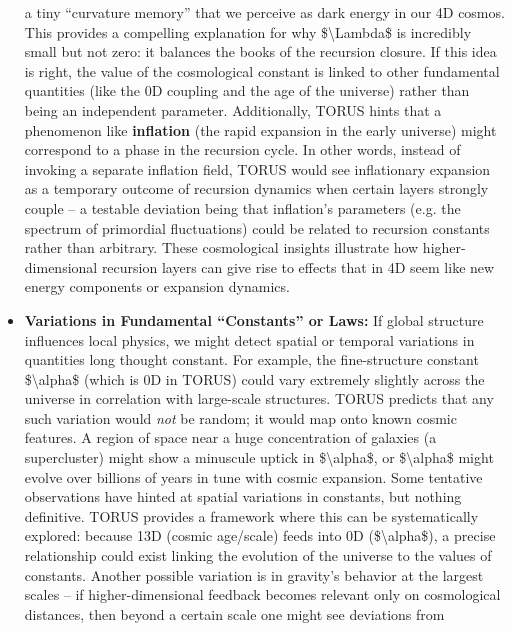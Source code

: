 \documentclass[
]{article}
\begin{document}
\begin{itemize}
  a tiny ``curvature memory'' that we perceive as dark energy in our 4D
  cosmos. This provides a compelling explanation for why
  \$\textbackslash Lambda\$ is incredibly small but not zero: it
  balances the books of the recursion closure. If this idea is right,
  the value of the cosmological constant is linked to other fundamental
  quantities (like the 0D coupling and the age of the universe) rather
  than being an independent parameter. Additionally, TORUS hints that a
  phenomenon like \textbf{inflation} (the rapid expansion in the early
  universe) might correspond to a phase in the recursion
  cycle\hspace{0pt}. In other words, instead of invoking a separate
  inflation field, TORUS would see inflationary expansion as a temporary
  outcome of recursion dynamics when certain layers strongly couple -- a
  testable deviation being that inflation's parameters (e.g. the
  spectrum of primordial fluctuations) could be related to recursion
  constants rather than arbitrary. These cosmological insights
  illustrate how higher-dimensional recursion layers can give rise to
  effects that in 4D seem like new energy components or expansion
  dynamics.
\item
  \textbf{Variations in Fundamental ``Constants'' or Laws:} If global
  structure influences local physics, we might detect spatial or
  temporal variations in quantities long thought constant. For example,
  the fine-structure constant \$\textbackslash alpha\$ (which is 0D in
  TORUS) could vary extremely slightly across the universe in
  correlation with large-scale structures. TORUS predicts that any such
  variation would \emph{not} be random; it would map onto known cosmic
  features\hspace{0pt}. A region of space near a huge concentration of
  galaxies (a supercluster) might show a minuscule uptick in
  \$\textbackslash alpha\$, or \$\textbackslash alpha\$ might evolve
  over billions of years in tune with cosmic expansion\hspace{0pt}. Some
  tentative observations have hinted at spatial variations in constants,
  but nothing definitive. TORUS provides a framework where this can be
  systematically explored: because 13D (cosmic age/scale) feeds into 0D
  (\$\textbackslash alpha\$), a precise relationship could exist linking
  the evolution of the universe to the values of constants. Another
  possible variation is in gravity's behavior at the largest scales --
  if higher-dimensional feedback becomes relevant only on cosmological
  distances, then beyond a certain scale one might see deviations from

\end{itemize}
\end{document}
